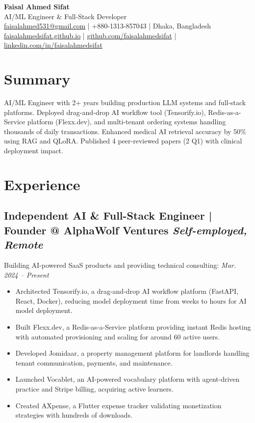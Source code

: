 \documentclass[letterpaper,10pt]{article}
\begin{document}
\pagestyle{empty} %

\begin{center}
    {\Huge \bfseries Faisal Ahmed Sifat} \\
    \vspace{2pt}
    AI/ML Engineer \& Full-Stack Developer \\
    \vspace{2pt}
    \href{mailto:faisalahmed531@gmail.com}{faisalahmed531@gmail.com} | +880-1313-857043 | Dhaka, Bangladesh \\
    \href{https://faisalahmedsifat.github.io}{faisalahmedsifat.github.io} | \href{https://github.com/faisalahmedsifat}{github.com/faisalahmedsifat} | \href{https://linkedin.com/in/faisalahmedsifat}{linkedin.com/in/faisalahmedsifat}
\end{center}
\vspace{-5pt} %

\section*{Summary}
\RaggedRight
AI/ML Engineer with 2+ years building production LLM systems and full-stack platforms. Deployed drag-and-drop AI workflow tool (Tensorify.io), Redis-as-a-Service platform (Flexx.dev), and multi-tenant ordering systems handling thousands of daily transactions. Enhanced medical AI retrieval accuracy by 50\% using RAG and QLoRA. Published 4 peer-reviewed papers (2 Q1) with clinical deployment impact.

\section*{Experience}

\subsection*{\textbf{Independent AI \& Full-Stack Engineer | Founder @ AlphaWolf Ventures} \hfill \textit{Self-employed, Remote}}
Building AI-powered SaaS products and providing technical consulting:
\textit{Mar. 2024 – Present}
\begin{itemize}
    \item Architected Tensorify.io, a drag-and-drop AI workflow platform (FastAPI, React, Docker), reducing model deployment time from weeks to hours for AI model deployment.
    \item Built Flexx.dev, a Redis-as-a-Service platform providing instant Redis hosting with automated provisioning and scaling for around 60 active users.
    \item Developed Jomidaar, a property management platform for landlords handling tenant communication, payments, and maintenance.
    \item Launched Vocablet, an AI-powered vocabulary platform with agent-driven practice and Stripe billing, acquiring active learners.
    \item Created AXpense, a Flutter expense tracker validating monetization strategies with hundreds of downloads.
\end{itemize}
\end{document}
